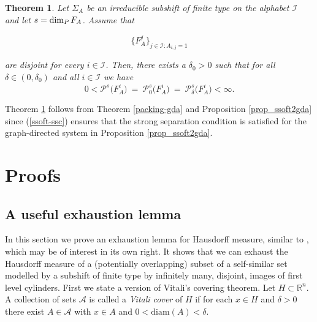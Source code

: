 \documentclass[11pt,english,british]{article}
\numberwithin{equation}{section}
\newtheorem{thm}{Theorem}[section]
\begin{document}
\begin{thm} \label{packing-ssoft}
Let $\Sigma_{A}$ be an irreducible subshift of finite type on the alphabet $\mathcal{I}$ and let $s = \dim_\text{\emph{P}} F_A$. Assume that

\begin{equation} \label{ssoft-ssc}
\{F_A^j\}_{j \in \mathcal{I} : A_{i,j} = 1}
\end{equation}

are disjoint for every $i\in \mathcal{I}$. Then, there exists a $\delta_0>0$ such that for all $\delta \in (0, \delta_0)$ and all $i\in \mathcal{I}$ we have
\[
0< \mathcal{P}^s \big(F_A^i \big) \ = \  \mathcal{P}_0^s  \big(F_A^i \big) \ = \ \mathcal{P}_{\delta}^s  \big(F_A^i \big)< \infty.
\]
\end{thm}
Theorem \ref{packing-ssoft} follows from Theorem \ref{packing-gda} and Proposition \ref{prop_ssoft2gda} since (\ref{ssoft-ssc}) ensures that the strong separation condition is satisfied for the graph-directed system in  Proposition \ref{prop_ssoft2gda}.




\section{Proofs}



\subsection{A useful exhaustion lemma}

In this section we prove an exhaustion lemma for Hausdorff measure, similar to \cite[Proposition 1.9]{farkas}, which may be of interest in its own right.  It shows that we can exhaust the Hausdorff measure of a (potentially overlapping) subset of a self-similar set modelled by a subshift of finite type by infinitely many, disjoint, images of first level cylinders. First we state a version of Vitali's covering theorem. Let $H\subset\mathbb{R}^{n}$. A collection of sets $\mathcal{A}$
is called a \textsl{Vitali cover} of $H$ if for each $x\in H$ and $\delta>0$
there exist $A\in\mathcal{A}$ with $x\in A$ and $0<\mathrm{diam}(A)<\delta$.
\end{document}
